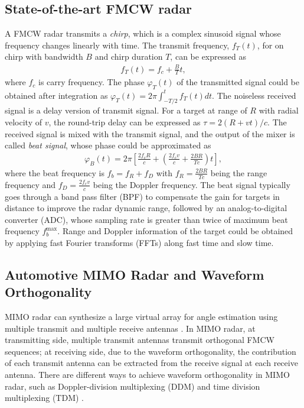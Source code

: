 \documentclass[conference]{IEEEtran}
\begin{document}
\subsection{State-of-the-art FMCW radar }



A FMCW radar transmits a \emph{chirp}, which is a complex sinusoid signal whose frequency changes linearly with time.  The transmit frequency, $f_{T}(t)$, for on chirp with bandwidth $B$ and chirp duration $T$, can be expressed as
\begin{align}
f_{T}\left(t\right) = f_c + \frac{B}{T}t, 
\end{align}
where $f_{c}$ is carry frequency.  
The phase $\varphi_{T}(t)$ of the transmitted signal could be obtained after integration as $\varphi_{T}\left( t \right) = 2\pi\int_{-T/2}^{t}f_{T}\left(t\right) dt$. 
The noiseless received signal is a delay version of transmit signal. For a target at range of $R$ with  radial velocity of $v$, the round-trip delay can be expressed as $\tau= 2(R+v t) /c$.
The received signal is mixed with the transmit signal, and the output of the mixer is called \emph{beat signal}, whose phase could be approximated as 
\begin{align}
\varphi_{B}(t)=
2\pi\left [  
\frac{2f_{c}R}{c}+ \left(\frac{2f_c v}{c}+\frac{2B R}{Tc} \right)t
\right ],
\end{align}
where the beat frequency is $f_b = f_R+f_D$ with $f_R = \frac{2B R}{Tc}$ being the range frequency and $f_D = \frac{2f_c v}{c}$ being the Doppler frequency.
The beat signal typically goes through a band pass filter (BPF) to compensate the gain for targets in distance to improve the radar dynamic range, followed by an analog-to-digital converter (ADC), whose sampling rate is greater than twice of maximum beat frequency $f_b^{\max}$. 
Range and Doppler information of the target could be obtained by applying fast Fourier transforms (FFTs) along fast time and slow time.
\vspace{-0mm}
\subsection{Automotive MIMO  Radar and Waveform Orthogonality}
MIMO radar can synthesize a large virtual array for angle estimation using  multiple transmit and multiple receive antennas \cite{Jian_07,SUN_SPM_Feature_Article_2020}. In MIMO radar, at transmitting side, multiple transmit antennas transmit orthogonal FMCW sequences; at receiving side, due to the waveform orthogonality, the contribution of each transmit antenna can be extracted from the receive signal at each receive antenna. 
There are different ways to achieve waveform orthogonality in MIMO radar, such as Doppler-division multiplexing (DDM) and time division multiplexing (TDM) \cite{SUN_SPM_Feature_Article_2020}. 
\end{document}
